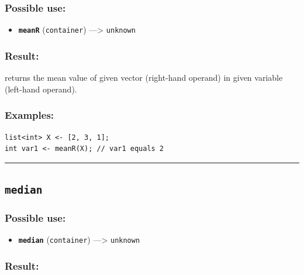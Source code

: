 \documentclass[]{book}
\providecommand{\tightlist}{%
  \setlength{\itemsep}{0pt}\setlength{\parskip}{0pt}}
\theoremstyle{definition}
\theoremstyle{definition}
\theoremstyle{definition}
\theoremstyle{remark}
\begin{document}
\subsubsection{Possible use:}\label{possible-use-346}

\begin{itemize}
\tightlist
\item
  \textbf{\texttt{meanR}} (\texttt{container}) ---\textgreater{}
  \texttt{unknown}
\end{itemize}

\subsubsection{Result:}\label{result-335}

returns the mean value of given vector (right-hand operand) in given
variable (left-hand operand).

\subsubsection{Examples:}\label{examples-239}

\begin{verbatim}
list<int> X <- [2, 3, 1];  
int var1 <- meanR(X); // var1 equals 2
\end{verbatim}

\begin{center}\rule{0.5\linewidth}{\linethickness}\end{center}

\subsection{\texorpdfstring{\texttt{median}}{median}}\label{median}

\subsubsection{Possible use:}\label{possible-use-347}

\begin{itemize}
\tightlist
\item
  \textbf{\texttt{median}} (\texttt{container}) ---\textgreater{}
  \texttt{unknown}
\end{itemize}

\subsubsection{Result:}\label{result-336}
\end{document}
